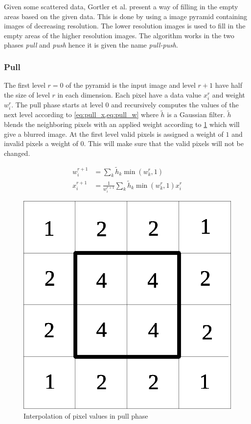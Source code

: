 Given some scattered data, Gortler et al. \cite{Gortler96thelumigraph} present a way of filling in the empty areas based on the given data. This is done by using a image pyramid containing images of decreasing resolution. The lower resolution images is used to fill in the empty areas of the higher resolution images. The algorithm works in the two phases \emph{pull} and \emph{push} hence it is given the name \emph{pull-push}.

\begin{subs}
\subsubsection{Pull}
The first level $r = 0$ of the pyramid is the input image and level $r + 1$ have half the size of level $r$ in each dimension. Each pixel have a data value $x^r_i$ and weight $w^r_i$. The pull phase starts at level 0 and recursively computes the values of the next level according to \cref{eq:pull_x,eq:pull_w} where $\tilde{h}$ is a Gaussian filter. $\tilde{h}$ blends the neighboring pixels with an applied weight according to \cref{fig:pull_filter} which will give a blurred image. At the first level valid pixels is assigned a weight of $1$ and invalid pixels a weight of $0$. This will make sure that the valid pixels will not be changed.

\begin{align}
  w^{r+1}_i &= \sum_k {\tilde{h}_k \min(w^r_k,1)} \label{eq:pull_x}\\
  x^{r+1}_i &= \frac{1}{w^{r+1}_i} \sum_k {\tilde{h}_k \min(w^r_k,1) x^r_i} \label{eq:pull_w}
\end{align}



\begin{figure}[h]
    \centering
    \includegraphics[width=.3\textwidth]{figures/pull_filter.eps}
    \caption{Interpolation of pixel values in pull phase}
    \label{fig:pull_filter}
\end{figure}
\end{subs}


